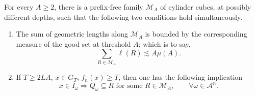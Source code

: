 \documentclass[12pt]{amsart}
\numberwithin{equation}{section}
\begin{document}
\begin{lemma}\label{lem:marked-packing}
For every $A\geq2$, there is a prefix-free family $\mathscr M_A$ of cylinder cubes, at possibly different depths, such that the following two conditions hold simultaneously.
\begin{enumerate}
\item The sum of geometric lengths along $\mathscr M_A$ is bounded by the corresponding measure of the good set at threshold $A$; which is to say,
\begin{equation}\label{eq:marked-packing}
\sum_{R\in\mathscr M_A}\ell(R)\lesssim A\mu(A).
\end{equation}
\item If $T\geq2LA$, $x\in G_T$, $f_n(x)\geq T$, then one has the following implication
\begin{equation}\label{eq:marked-packing-2}
x \in I_{\omega} \Longrightarrow Q_{\omega}\subseteq R
\text{ for some }R\in\mathscr{M}_A, \qquad \forall \omega \in \mathcal{A}^n.
\end{equation}
\end{enumerate}


\end{lemma}
\end{document}
